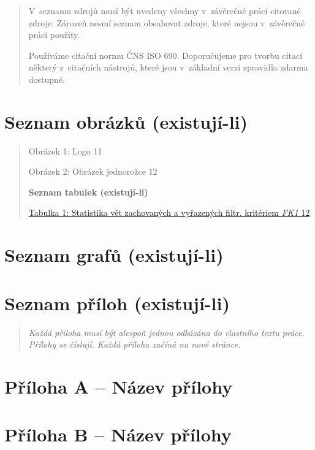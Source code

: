 \documentclass[
]{article}
\begin{document}
    \begin{quote}
        V~seznamu zdrojů musí být uvedeny všechny v~závěrečné práci citované
        zdroje. Zároveň nesmí seznam obsahovat zdroje, které nejsou v~závěrečné
        práci použity.

        Používáme citační normu ČNS ISO 690. Doporučujeme pro tvorbu citací
        některý z~citačních nástrojů, které jsou v~základní verzi zpravidla
        zdarma dostupné.
    \end{quote}

    \newpage
    \hypertarget{seznam-obruxe1zkux16f-existujuxed-li}{%
        \section{Seznam obrázků
            (existují-li)}\label{seznam-obruxe1zkux16f-existujuxed-li}}

    \begin{quote}
        Obrázek 1: Logo 11

        Obrázek 2: Obrázek jednorožce 12

        \newpage
        \textbf{Seznam tabulek (existují-li)}

        \protect\hyperlink{_bookmark9}{Tabulka 1: Statistika vět zachovaných a
        vyřazených filtr. kritériem \emph{FK1} 12}
    \end{quote}

    \newpage
    \hypertarget{seznam-grafux16f-existujuxed-li}{%
        \section{Seznam grafů
            (existují-li)}\label{seznam-grafux16f-existujuxed-li}}

    \newpage
    \hypertarget{seznam-pux159uxedloh-existujuxed-li}{%
        \section{Seznam příloh
            (existují-li)}\label{seznam-pux159uxedloh-existujuxed-li}}

    \begin{quote}
        \emph{Každá příloha musí být alespoň jednou odkázána do vlastního textu
        práce. Přílohy se číslují. Každá příloha začíná na nové stránce.}
    \end{quote}

    \newpage
    \hypertarget{pux159uxedloha-a-nuxe1zev-pux159uxedlohy}{%
        \section{Příloha A -- Název
        přílohy}\label{pux159uxedloha-a-nuxe1zev-pux159uxedlohy}}

    \newpage
    \hypertarget{pux159uxedloha-b-nuxe1zev-pux159uxedlohy}{%
        \section{Příloha B -- Název
        přílohy}\label{pux159uxedloha-b-nuxe1zev-pux159uxedlohy}}
\end{document}
